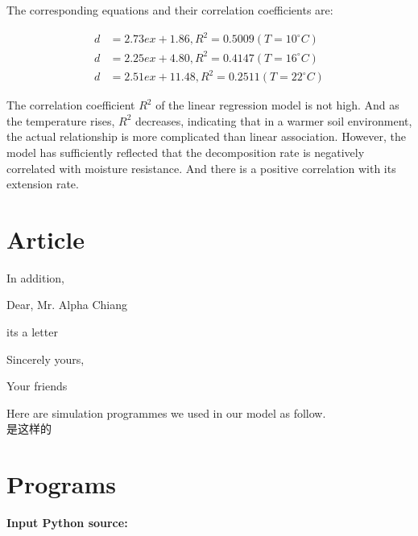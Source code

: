 \documentclass{mcmthesis}
\begin{document}
The corresponding equations and their correlation coefficients are: 

\begin{equation}
  \begin{split}
    d&=2.73ex+1.86,R^2=0.5009 (T=10^{\circ}C) \\
    d&=2.25ex+4.80,R^2=0.4147 (T=16^{\circ}C) \\
    d&=2.51ex+11.48,R^2=0.2511 (T=22^{\circ}C)
  \end{split}
\end{equation}

The correlation coefficient $ R^{2} $ of the linear regression model is not high. And as the temperature rises, $ R^{2} $ decreases, indicating that in a warmer soil environment, the actual relationship is more complicated than linear association. However, the model has sufficiently reflected that the decomposition rate is negatively correlated with moisture resistance. And there is a positive correlation with its extension rate.

{}



\begin{appendices}

\section{Article}

In addition, 

\begin{letter}{Dear, Mr. Alpha Chiang}

its a letter

\vspace{\parskip}

Sincerely yours,

Your friends

\end{letter}
Here are simulation programmes we used in our model as follow.\\
是这样的


\section{Programs}
\textbf{\textcolor[rgb]{0.98,0.00,0.00}{Input Python source:}}

\end{appendices}
\end{document}
